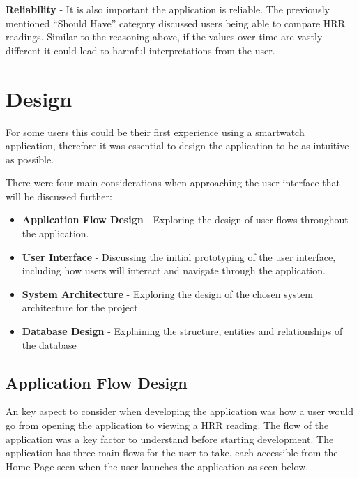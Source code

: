 \documentclass{l4proj}
\begin{document}
\textbf{Reliability} - It is also important the application is reliable. The previously mentioned “Should Have” category discussed users being able to compare HRR readings. Similar to the reasoning above, if the values over time are vastly different it could lead to harmful interpretations from the user.

\chapter{Design}

For some users this could be their first experience using a smartwatch application, therefore it was essential to design the application to be as intuitive as possible. 

There were four main considerations when approaching the user interface that will be discussed further:

\begin{itemize}
    \item \textbf{Application Flow Design} - Exploring the design of user flows throughout the application.
    \item \textbf{User Interface} - Discussing the initial prototyping of the user interface, including how users will interact and navigate through the application.
    \item \textbf{System Architecture} - Exploring the design of the chosen system architecture for the project
    \item \textbf{Database Design} - Explaining the structure, entities and relationships of the database
\end{itemize}

\section{Application Flow Design}

An key aspect to consider when developing the application was how a user would go from opening the application to viewing a HRR reading. The flow of the application was a key factor to understand before starting development. The application has three main flows for the user to take, each accessible from the Home Page seen when the user launches the application as seen below.
\end{document}
